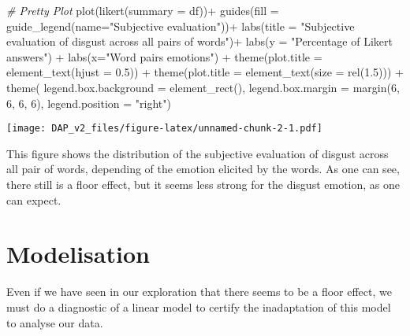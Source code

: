 \documentclass[
]{article}
\newenvironment{Shaded}{\begin{snugshade}}{\end{snugshade}}
\newcommand{\AttributeTok}[1]{\textcolor[rgb]{0.77,0.63,0.00}{#1}}
\newcommand{\CommentTok}[1]{\textcolor[rgb]{0.56,0.35,0.01}{\textit{#1}}}
\newcommand{\DecValTok}[1]{\textcolor[rgb]{0.00,0.00,0.81}{#1}}
\newcommand{\FloatTok}[1]{\textcolor[rgb]{0.00,0.00,0.81}{#1}}
\newcommand{\FunctionTok}[1]{\textcolor[rgb]{0.00,0.00,0.00}{#1}}
\newcommand{\NormalTok}[1]{#1}
\newcommand{\SpecialCharTok}[1]{\textcolor[rgb]{0.00,0.00,0.00}{#1}}
\newcommand{\StringTok}[1]{\textcolor[rgb]{0.31,0.60,0.02}{#1}}
\begin{document}
\begin{Shaded}
\begin{Highlighting}[]
\CommentTok{\# Pretty Plot}
\FunctionTok{plot}\NormalTok{(}\FunctionTok{likert}\NormalTok{(}\AttributeTok{summary =}\NormalTok{ df))}\SpecialCharTok{+} 
  \FunctionTok{guides}\NormalTok{(}\AttributeTok{fill =} \FunctionTok{guide\_legend}\NormalTok{(}\AttributeTok{name=}\StringTok{"Subjective evaluation"}\NormalTok{))}\SpecialCharTok{+} 
  \FunctionTok{labs}\NormalTok{(}\AttributeTok{title =} \StringTok{"Subjective evaluation of disgust across all pairs of words"}\NormalTok{)}\SpecialCharTok{+}
  \FunctionTok{labs}\NormalTok{(}\AttributeTok{y =} \StringTok{"Percentage of Likert answers"}\NormalTok{) }\SpecialCharTok{+}
  \FunctionTok{labs}\NormalTok{(}\AttributeTok{x=}\StringTok{"Word pairs\textquotesingle{} emotions"}\NormalTok{) }\SpecialCharTok{+}
  \FunctionTok{theme}\NormalTok{(}\AttributeTok{plot.title =} \FunctionTok{element\_text}\NormalTok{(}\AttributeTok{hjust =} \FloatTok{0.5}\NormalTok{)) }\SpecialCharTok{+}
  \FunctionTok{theme}\NormalTok{(}\AttributeTok{plot.title =} \FunctionTok{element\_text}\NormalTok{(}\AttributeTok{size =} \FunctionTok{rel}\NormalTok{(}\FloatTok{1.5}\NormalTok{))) }\SpecialCharTok{+}
  \FunctionTok{theme}\NormalTok{( }\AttributeTok{legend.box.background =} \FunctionTok{element\_rect}\NormalTok{(), }\AttributeTok{legend.box.margin =} \FunctionTok{margin}\NormalTok{(}\DecValTok{6}\NormalTok{, }\DecValTok{6}\NormalTok{, }\DecValTok{6}\NormalTok{, }\DecValTok{6}\NormalTok{), }\AttributeTok{legend.position =} \StringTok{"right"}\NormalTok{)}
\end{Highlighting}
\end{Shaded}

\texttt{[image: DAP\_v2\_files/figure-latex/unnamed-chunk-2-1.pdf]}

This figure shows the distribution of the subjective evaluation of
disgust across all pair of words, depending of the emotion elicited by
the words. As one can see, there still is a floor effect, but it seems
less strong for the disgust emotion, as one can expect.

\hypertarget{modelisation}{%
\section{Modelisation}\label{modelisation}}

Even if we have seen in our exploration that there seems to be a floor
effect, we must do a diagnostic of a linear model to certify the
inadaptation of this model to analyse our data.
\end{document}
